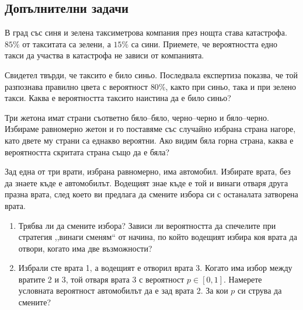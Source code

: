 \documentclass[11pt,a4paper]{article}
\newenvironment{enumeratea}{\begin{enumerate}[label=(\alph*),itemsep=0.28em,topsep=0.25em]}{\end{enumerate}}
\newcounter{problem}[section]
\begin{document}
\subsection*{Допълнителни задачи}

\begin{probleminteresting}
В град със синя и зелена таксиметрова компания през нощта става катастрофа.
$85\%$ от такситата са зелени, а $15\%$ са сини. Приемете, че вероятността
едно такси да участва в катастрофа не зависи от компанията.

Свидетел твърди, че таксито е било синьо. Последвала експертиза показва,
че той разпознава правилно цвета с вероятност $80\%$, както при синьо,
така и при зелено такси. Каква е вероятността таксито наистина да е било синьо?
\end{probleminteresting}

\begin{problem}
Три жетона имат страни съответно бяло--бяло, черно--черно и бяло--черно.
Избираме равномерно жетон и го поставяме със случайно избрана страна нагоре,
като двете му страни са еднакво вероятни.
Ако видим бяла горна страна, каква е вероятността скритата страна също
да е бяла?
\end{problem}

\begin{probleminteresting}
Зад една от три врати, избрана равномерно, има автомобил.
Избирате врата, без да знаете къде е автомобилът. Водещият знае къде е той
и винаги отваря друга празна врата, след което ви предлага да смените
избора си с останалата затворена врата.
\begin{enumeratea}
  \item Трябва ли да смените избора? Зависи ли вероятността да спечелите при
  стратегия ,,винаги сменям`` от начина, по който водещият избира коя
  врата да отвори, когато има две възможности?
  \item Избрали сте врата 1, а водещият е отворил врата 3. Когато има избор
  между вратите 2 и 3, той отваря врата 3 с вероятност $p\in[0,1]$.
  Намерете условната вероятност автомобилът да е зад врата 2.
  За кои $p$ си струва да смените?
\end{enumeratea}
\end{probleminteresting}
\end{document}
